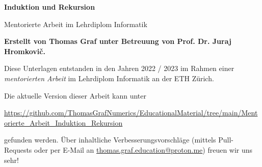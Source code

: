 \begin{titlepage}
    \thispagestyle{empty}
    \begin{center}
        \vspace*{1cm}
            
        {\Huge
        \textbf{Induktion und Rekursion}
            
        \vspace{0.5cm}
        \LARGE
        Mentorierte Arbeit im Lehrdiplom Informatik
            
        \vspace{1.5cm}
            
        \textbf{Erstellt von Thomas Graf unter Betreuung von Prof. Dr. Juraj Hromkovič.}
        }
        \vfill
        \clearpage
        \thispagestyle{empty}
        \mbox{}
        \vfill
        {\Large Diese Unterlagen entstanden in den Jahren 2022 / 2023 im Rahmen einer \textit{mentorierten Arbeit} im Lehrdiplom Informatik an der ETH Zürich.}

        \noindent
        Die aktuelle Version dieser Arbeit kann unter
        \begin{center}
            {\footnotesize
                \url{https://github.com/ThomasGrafNumerics/EducationalMaterial/tree/main/Mentorierte_Arbeit_Induktion_Rekursion}
            }
        \end{center}
        gefunden werden. Über inhaltliche Verbesserungsvorschläge (mittels Pull-Requests oder per E-Mail an \href{mailto:thomas.graf.education@proton.me}{thomas.graf.education@proton.me}) freuen wir uns sehr!
        \vspace{0.8cm}
    \end{center}
\end{titlepage}
